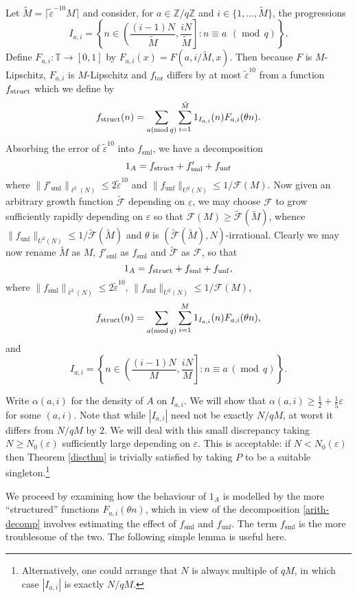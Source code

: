 \documentclass[10pt,reqno]{amsart}
\theoremstyle{definition}
\theoremstyle{remark}
\newcommand{\md}[1]{\ensuremath{\,(\operatorname{mod}\, #1)}}
\newcommand{\mdsub}[1]{\ensuremath{(\mbox{\scriptsize mod}\, #1)}}
\renewcommand{\leq}{\leqslant}
\renewcommand{\geq}{\geqslant}
\newcommand\tor{\operatorname{tor}}
\newcommand\sml{\operatorname{sml}}
\newcommand\unf{\operatorname{unf}}
\def\Z{\mathbb{Z}}
\def\T{\mathbb{T}}
\def\eps{\varepsilon}
\numberwithin{equation}{section}
\begin{document}
Let $\tilde M = \lceil{\tilde\eps}^{-10} M\rceil$ and consider, for $a \in \Z/q\Z$ and $i \in \{1,\dots, \tilde M\}$, the progressions \[I_{a,i} = \left\{ n \in  \left( \frac{(i-1)N}{\tilde M}, \frac{iN}{\tilde M} \right]: n \equiv a\ \md{q} \right\}.\] Define $F_{a,i}:\T\to[0,1]$ by $F_{a,i}(x) = F(a,i/{\tilde M},x)$. Then because $F$ is $M$-Lipschitz, $F_{a,i}$ is $M$-Lipschitz and $f_{\tor}$ differs by at most ${\tilde\eps}^{10}$ from a function $f_{\operatorname{struct}}$ which we define by
\[ f_{\struct}(n) = \sum_{a \mdsub{q}} \sum_{i=1}^{\tilde M} 1_{I_{a,i}}(n) F_{a,i}(\theta n). \]
Absorbing the error of $\tilde\eps^{10}$ into $f_{\sml}$, we have a decomposition
\[ 1_A = f_{\struct} + f'_{\sml} + f_{\unf}\]
where $\|f'_{\sml}\|_{\ell^2(N)} \leq 2{\tilde\eps}^{10}$ and $\|f_{\unf}\|_{U^2(N)} \leq 1/\mathcal{F}(M)$. Now given an arbitrary growth function $\tilde{\mathcal{F}}$ depending on ${\eps}$, we may choose $\mathcal{F}$ to grow sufficiently rapidly depending on ${\eps}$ so that $\mathcal{F}(M) \geq\tilde{\mathcal{F}}(\tilde M)$, whence $\|f_{\unf}\|_{U^2(N)} \leq 1/{\tilde{\mathcal{F}}}({\tilde M})$ and $\theta$ is $(\tilde{\mathcal{F}}(\tilde{M}),N)$-irrational. Clearly we may now rename $\tilde M$ as $M$, $f'_{\sml}$ as $f_{\sml}$ and $\tilde{\mathcal{F}}$ as $\mathcal{F}$, so that
\begin{equation}\label{arith-decomp} 1_A = f_{\struct} + f_{\sml} + f_{\unf},\end{equation}
where $\|f_{\sml}\|_{\ell^2(N)}\leq 2{\tilde\eps}^{10}$, $\|f_{\unf}\|_{U^2(N)} \leq1/\mathcal{F}(M)$, 
\[ f_{\struct}(n) = \sum_{a \mdsub{q}} \sum_{i=1}^{M} 1_{I_{a,i}}(n) F_{a,i}(\theta n),\]
and \[ I_{a,i} = \left\{ n \in  \left(\frac{(i-1)N}{M}, \frac{iN}{M}\right]: n \equiv a \md{q} \right\}.\]

Write $\alpha(a,i)$ for the density of $A$ on $I_{a,i}$. We will show that $\alpha(a,i)\geq\tfrac{1}{2} + \tfrac{1}{5}\eps$ for some $(a,i)$. Note that while $|I_{a,i}|$ need not be exactly $N/qM$, at worst it differs from $N/qM$ by $2$. We will deal with this small discrepancy taking $N\geq N_0(\eps)$ sufficiently large depending on $\eps$. This is acceptable: if $N<N_0(\eps)$ then Theorem \ref{discthm} is trivially satisfied by taking $P$ to be a suitable singleton.\footnote{Alternatively, one could arrange that $N$ is always multiple of $qM$, in which case $|I_{a,i}|$ is exactly $N/qM$.}

We proceed by examining how the behaviour of $1_A$ is modelled by the more ``structured'' functions $F_{a,i}(\theta n)$, which in view of the decomposition \ref{arith-decomp} involves estimating the effect of $f_{\sml}$ and $f_{\unf}$. The term $f_{\sml}$ is the more troublesome of the two. The following simple lemma is useful here.
\end{document}

